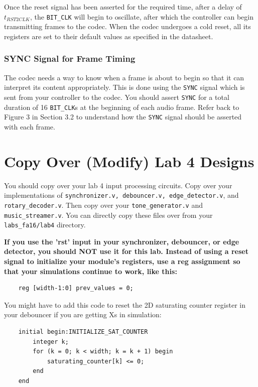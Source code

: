 \documentclass[11pt]{article}
\begin{document}
Once the reset signal has been asserted for the required time, after a delay of $t_{RST2CLK}$, the \verb|BIT_CLK| will begin to oscillate, after which the controller can begin transmitting frames to the codec. When the codec undergoes a cold reset, all its registers are set to their default values as specified in the datasheet.

\subsubsection{SYNC Signal for Frame Timing}
The codec needs a way to know when a frame is about to begin so that it can interpret its content appropriately. This is done using the \verb|SYNC| signal which is sent from your controller to the codec. You should assert \verb|SYNC| for a total duration of 16 \verb|BIT_CLK|s at the beginning of each audio frame. Refer back to Figure 3 in Section 3.2 to understand how the \verb|SYNC| signal should be asserted with each frame.

\section{Copy Over (Modify) Lab 4 Designs}
You should copy over your lab 4 input processing circuits. Copy over your implementations of \verb|synchronizer.v, debouncer.v, edge_detector.v|, and \verb|rotary_decoder.v|. Then copy over your \verb|tone_generator.v| and \verb|music_streamer.v|. You can directly copy these files over from your \verb|labs_fa16/lab4| directory.

\textbf{If you use the 'rst' input in your synchronizer, debouncer, or edge detector, you should NOT use it for this lab. Instead of using a reset signal to initialize your module's registers, use a reg assignment so that your simulations continue to work, like this:}

\begin{verbatim}
	reg [width-1:0] prev_values = 0;
\end{verbatim}

You might have to add this code to reset the 2D saturating counter register in your debouncer if you are getting Xs in simulation:

\begin{verbatim}
    initial begin:INITIALIZE_SAT_COUNTER
	    integer k;
	    for (k = 0; k < width; k = k + 1) begin
		    saturating_counter[k] <= 0;
	    end
    end
\end{verbatim}
\end{document}
